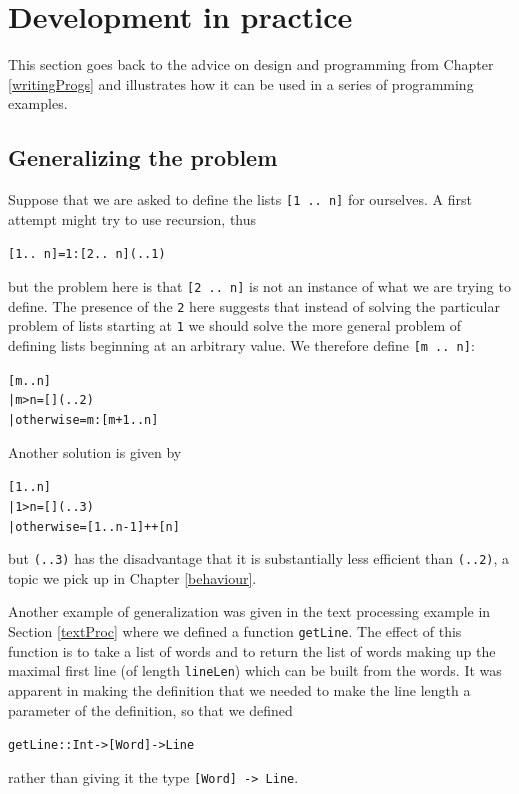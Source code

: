 \section{Development in practice}

This section goes back to the advice on design and programming
from Chapter \ref{writingProgs} and illustrates how it can be used in a series of
programming examples.

\subsection*{Generalizing the problem}

Suppose that we are asked to define the lists \texttt{[1 ..\ n]} for
ourselves. A first attempt might try to use recursion, thus
\begin{alltt}
[1 ..\ n] = 1 : [2 ..\ n]\hfill(..1)
\end{alltt}
but the problem here is that \texttt{[2 ..\ n]} is not an instance of
what we are trying to define. The presence of the \texttt{2} here suggests 
that instead of solving the particular
problem of lists starting at \texttt{1} we should solve the more general problem
of defining lists beginning at an arbitrary value. We therefore define \texttt{[m ..\ n]}:
\begin{alltt}
[m .. n]
  | m>n         = []\hfill(..2)
  | otherwise   = m : [m+1 .. n]
\end{alltt}
Another solution is given by 
\begin{alltt}
[1 .. n] 
  | 1>n         = []\hfill(..3)
  | otherwise   = [1 .. n-1] ++ [n]
\end{alltt}
but \texttt{(..3)} has the disadvantage that it is substantially less
efficient than \texttt{(..2)}, a topic we pick up in Chapter
\ref{behaviour}.

Another example of generalization was given in the text processing
example in Section \ref{textProc} where we defined a function
\texttt{getLine}. The effect of this function is to take a list of words
and to return the list of words making up the maximal first line (of length
\texttt{lineLen}) which can be
built from the words. It was apparent in making the definition that we
needed to make the line length a parameter of the definition, so that
we defined
\begin{alltt}
getLine :: Int -> [Word] -> Line
\end{alltt}
rather than giving it the type \texttt{[Word] -> Line}.

